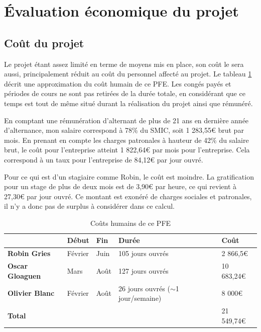 \documentclass[openany, 11pt]{memoir}
\begin{document}
\newpage
\section{Évaluation économique du projet}

\subsection{Coût du projet}

Le projet étant assez limité en terme de moyens mis en place, son coût le sera aussi, principalement réduit au coût du personnel affecté au projet. Le tableau \ref{couts} décrit une approximation du coût humain de ce PFE. Les congés payés et périodes de cours ne sont pas retirées de la durée totale, en considérant que ce temps est tout de même situé durant la réalisation du projet ainsi que rémunéré.

\bigskip
En comptant une rémunération d'alternant de plus de 21 ans en dernière année d'alternance, mon salaire correspond à 78\% du SMIC, soit 1 283,55€ brut par mois. En prenant en compte les charges patronales à hauteur de 42\% du salaire brut, le coût pour l'entreprise atteint 1 822,64€ par mois pour l'entreprise.  Cela correspond à un taux pour l'entreprise de 84,12€ par jour ouvré.

Pour ce qui est d'un stagiaire comme Robin, le coût est moindre. La gratification pour un stage de plus de deux mois est de 3,90€ par heure, ce qui revient à 27,30€ par jour ouvré. Ce montant est exonéré de charges sociales et patronales, il n'y a donc pas de surplus à considérer dans ce calcul.

\begin{table}[ht]
	\centering
	\begin{tabular}{|l|l|l|l|l|}
		\hline
		& \textbf{Début} & \textbf{Fin} & \textbf{Durée} & \textbf{Coût} \\
		\hline
		\textbf{Robin Gries} & Février & Juin & 105 jours ouvrés & 2 866,5€ \\
		\hline
		\textbf{Oscar Gloaguen} & Mars & Août & 127 jours ouvrés & 10 683,24€ \\
		\hline
		\textbf{Olivier Blanc} & Février & Août & \makecell[l]{26 jours ouvrés \\ ($\sim$1 jour/semaine)} & 8 000€ \\
		\hline \hline
		\multicolumn{4}{|l|}{\textbf{Total}} & 21 549,74€  \\
		\hline
	\end{tabular}
	\caption{Coûts humains de ce PFE}
	\label{couts}
\end{table}
\end{document}
